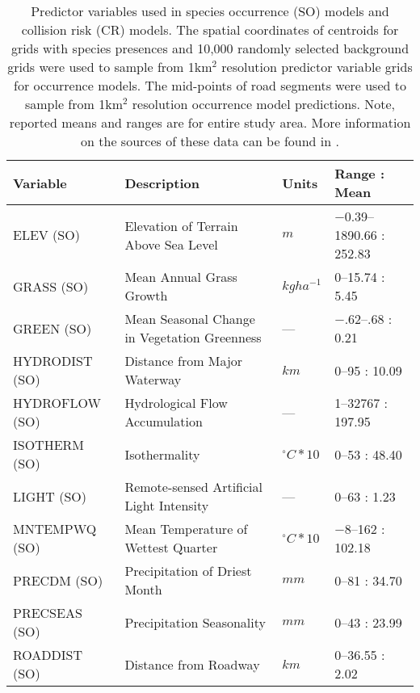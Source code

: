 \begin{table}[!t]
\caption[Predictor variables used in species occurrence models and collision risk models]{Predictor variables used in species occurrence (SO) models and collision risk (CR) models. The spatial coordinates of centroids for grids with species presences and 10,000 randomly selected background grids were used to sample from 1km$^2$ resolution predictor variable grids for occurrence models. The mid-points of road segments were used to sample from 1km$^2$ resolution occurrence model predictions. Note, reported means and ranges are for entire study area. More information on the sources of these data can be found in .}
\centering
\setlength{\extrarowheight}{.2em}
\begin{tabularx}{0.9\textwidth}{lYll} \toprule
Variable       &Description                                               &Units          &Range : Mean\\
\midrule 
ELEV (SO)       &Elevation of Terrain Above Sea Level                     &$m$			  &$-$0.39--1890.66 : 252.83\\
GRASS (SO)      &Mean Annual Grass Growth \citep{cart03}	              &$kg ha^{-1}$   &0--15.74 : 5.45\\
GREEN (SO)      &Mean Seasonal Change in Vegetation Greenness             &---            &$-$.62--.68 : 0.21\\
HYDRODIST (SO)  &Distance from Major Waterway                             &$km$           &0--95 : 10.09\\
HYDROFLOW (SO)  &Hydrological Flow Accumulation                           &---            &1--32767 : 197.95\\
ISOTHERM (SO)   &Isothermality                                            &$^{\circ}C*10$ &0--53 : 48.40\\
LIGHT (SO)      &Remote-sensed Artificial Light Intensity                 &---            &0--63 : 1.23\\
MNTEMPWQ (SO)   &Mean Temperature of Wettest Quarter                      &$^{\circ}C*10$ &$-$8--162 : 102.18\\
PRECDM (SO)     &Precipitation of Driest Month                            &$mm$           &0--81 : 34.70\\
PRECSEAS (SO)   &Precipitation Seasonality                                &$mm$           &0--43 : 23.99\\
ROADDIST (SO)   &Distance from Roadway                                    &$km$           &0--36.55 : 2.02\\

\end{tabularx}
\end{table}
